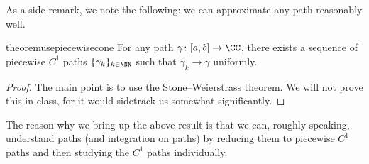 \documentclass[../notes.tex]{subfiles}
\begin{document}
As a side remark, we note the following: we can approximate any path reasonably well.
\begin{restatable}{theorem}{usepiecewisecone} \label{thm:usepiecewisec1}
	For any path $\gamma\colon [a,b]\to\CC$, there exists a sequence of piecewise $C^1$ paths $\{\gamma_k\}_{k\in\NN}$ such that $\gamma_k\to\gamma$ uniformly.
\end{restatable}
\begin{proof}
	The main point is to use the Stone--Weierstrass theorem. We will not prove this in class, for it would sidetrack us somewhat significantly.
\end{proof}
The reason why we bring up the above result is that we can, roughly speaking, understand paths (and integration on paths) by reducing them to piecewise $C^1$ paths and then studying the $C^1$ paths individually.
\end{document}
